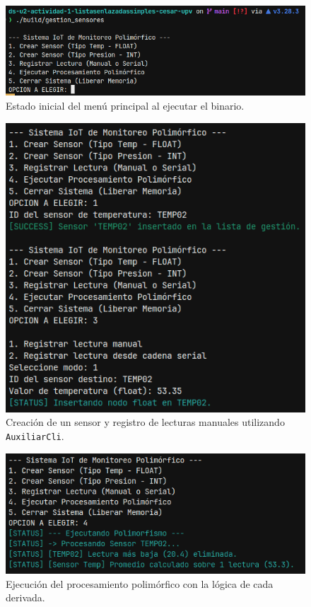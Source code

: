 \documentclass[11pt,a4paper]{article}
\begin{document}
\begin{figure}[h]
    \centering
    \includegraphics[width=0.8\linewidth]{alIniciarPrograma.png}
    \caption{Estado inicial del menú principal al ejecutar el binario.}
    \label{fig:inicio}
\end{figure}

\begin{figure}[h]
    \centering
    \includegraphics[width=0.8\linewidth]{crearSensorYLectura.png}
    \caption{Creación de un sensor y registro de lecturas manuales utilizando \texttt{AuxiliarCli}.}
    \label{fig:crear}
\end{figure}

\begin{figure}[h]
    \centering
    \includegraphics[width=0.8\linewidth]{ejecutarProcesamientoPolimorfico.png}
    \caption{Ejecución del procesamiento polimórfico con la lógica de cada derivada.}
    \label{fig:procesar}
\end{figure}
\end{document}
